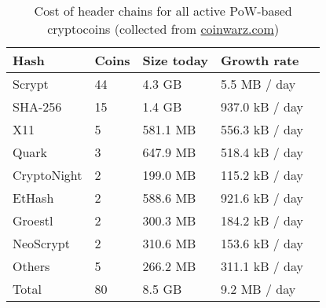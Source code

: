 \begin{table}
  \caption{Cost of header chains for all active PoW-based cryptocoins
           (collected from \url{coinwarz.com})}
  \label{tbl.currencies}
  \small
  \centering
  \begin{tabular}{l@{}|l|l|l@{}}
    {\bf Hash} & {\bf Coins} & {\bf Size today} & {\bf Growth rate}  \\
    \hline
    Scrypt  & 44  & 4.3 GB  & 5.5 MB / day \  \\
    SHA-256  & 15  & 1.4 GB  & 937.0 kB / day \  \\
    X11  & 5  & 581.1 MB  & 556.3 kB / day \  \\
    Quark  & 3  & 647.9 MB  & 518.4 kB / day \  \\
    CryptoNight  & 2  & 199.0 MB  & 115.2 kB / day \  \\
    EtHash  & 2  & 588.6 MB  & 921.6 kB / day \  \\
    Groestl  & 2  & 300.3 MB  & 184.2 kB / day \  \\
    NeoScrypt  & 2  & 310.6 MB  & 153.6 kB / day \  \\
    Others  & 5  & 266.2 MB  & 311.1 kB / day \  \\
    \hline
    Total  & 80   &  8.5 GB  & 9.2 MB  / day  \\
  \end{tabular}
\end{table}


